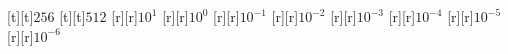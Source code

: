 \begin{psfrags}
[t][t]{${256}$}%
[t][t]{${512}$}%
%
[r][r]{$10^{1}$}%
[r][r]{$10^{0}$}%
[r][r]{$10^{-1}$}%
[r][r]{$10^{-2}$}%
[r][r]{$10^{-3}$}%
[r][r]{$10^{-4}$}%
[r][r]{$10^{-5}$}%
[r][r]{$10^{-6}$}%
%
%
\end{psfrags}%
%
